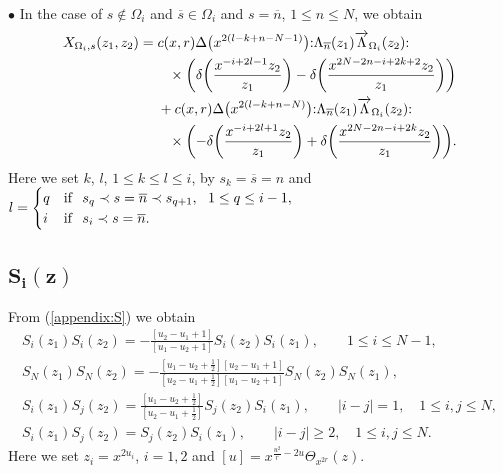 \documentclass[pdftex]{sigma}
\numberwithin{equation}{section}
\begin{document}
\noindent
$\bullet$
In the case of $s \notin \Omega_i$ and $\overline{s} \in \Omega_i$ and
$s=\overline{n}$, $1\leq n \leq N$, we obtain
\begin{align}
X_{\Omega_i,s}(z_1,z_2)={}&
c(x,r)\Delta\big(x^{2(l-k+n-N-1)}\big)
{:}\Lambda_{\overline{n}}(z_1)\overrightarrow{\Lambda}_{\Omega_i}(z_2){:}\notag
\\
&\phantom{+}\times\bigg(\delta\bigg(\frac{x^{-i+2l-1}z_2}{z_1}\bigg)-
\delta\bigg(\frac{x^{2N-2n-i+2k+2} z_2}{z_1}\bigg)\bigg)\notag
\\
&+c(x,r)\Delta\big(x^{2(l-k+n-N)}\big)
{:}\Lambda_{\overline{n}}(z_1)\overrightarrow{\Lambda}_{\Omega_i}(z_2){:}\notag
\\
&\phantom{+}\times\bigg({-}\delta\bigg(\frac{x^{-i+2l+1}z_2}{z_1}\bigg)+
\delta\bigg(\frac{x^{2N-2n-i+2k} z_2}{z_1}\bigg)\bigg).
\label{exchange:L7}
\end{align}
Here we set $k$, $l$, $1\leq k \leq l \leq i$, by
$s_k=\overline{s}=n$ and $l=\begin{cases}
q&{\rm if}\ \ s_{q} \prec s=\overline{n} \prec s_{q+1},\ \ 1 \leq q \leq i-1,\\
i&{\rm if}\ \ s_i \prec s=\overline{n}.
\end{cases}$



\subsection[\protect{$S\_\{i\}(z)$}]{$\boldsymbol{S_i(z)}$}
From (\ref{appendix:S}) we obtain
\begin{gather}
S_i(z_1)S_i(z_2)=-\frac{[u_2-u_1+1]}{[u_1-u_2+1]}S_i(z_2)S_i(z_1),\qquad
1\leq i \leq N-1,\nonumber
\\
S_N(z_1)S_N(z_2)=-\frac{[u_1-u_2+\frac{1}{2}][u_2-u_1+1]}{
[u_2-u_1+\frac{1}{2}][u_1-u_2+1]}S_N(z_2)S_N(z_1),\nonumber
\\
S_i(z_1)S_j(z_2)=\frac{[u_1-u_2+\frac{1}{2}]}{[u_2-u_1+\frac{1}{2}]}S_j(z_2)S_i(z_1),\qquad
|i-j|=1,\quad 1\leq i,j \leq N,\nonumber
\\
S_i(z_1)S_j(z_2)=S_j(z_2)S_i(z_1),\qquad
|i-j|\geq 2,\quad 1\leq i,j \leq N.\label{exchange:S}
\end{gather}
Here we set $z_i=x^{2u_i}$, $i=1,2$ and
$[u]=x^{\frac{u^2}{r}-2u}\Theta_{x^{2r}}(z)$.
\end{document}
